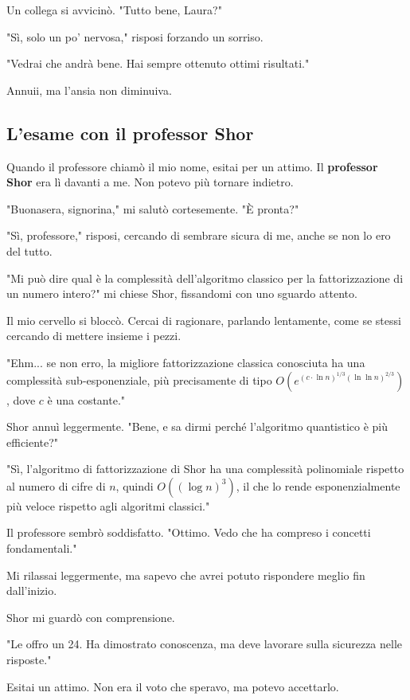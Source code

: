 Un collega si avvicinò. "Tutto bene, Laura?"

"Sì, solo un po' nervosa," risposi forzando un sorriso.

"Vedrai che andrà bene. Hai sempre ottenuto ottimi risultati."

Annuii, ma l'ansia non diminuiva.

\subsection{L'esame con il professor Shor}

Quando il professore chiamò il mio nome, esitai per un attimo. Il \textbf{professor Shor} era lì davanti a me. Non potevo più tornare indietro.

"Buonasera, signorina," mi salutò cortesemente. "È pronta?"

"Sì, professore," risposi, cercando di sembrare sicura di me, anche se non lo ero del tutto.

"Mi può dire qual è la complessità dell'algoritmo classico per la fattorizzazione di un numero intero?" mi chiese Shor, fissandomi con uno sguardo attento.

Il mio cervello si bloccò. Cercai di ragionare, parlando lentamente, come se stessi cercando di mettere insieme i pezzi.

"Ehm... se non erro, la migliore fattorizzazione classica conosciuta ha una complessità sub-esponenziale, più precisamente di tipo $O\left(e^{(c \cdot \ln n)^{1/3} (\ln \ln n)^{2/3}}\right)$, dove $c$ è una costante."

Shor annuì leggermente. "Bene, e sa dirmi perché l'algoritmo quantistico è più efficiente?"

"Sì, l'algoritmo di fattorizzazione di Shor ha una complessità polinomiale rispetto al numero di cifre di $n$, quindi $O((\log n)^3)$, il che lo rende esponenzialmente più veloce rispetto agli algoritmi classici."

Il professore sembrò soddisfatto. "Ottimo. Vedo che ha compreso i concetti fondamentali."

Mi rilassai leggermente, ma sapevo che avrei potuto rispondere meglio fin dall'inizio.

Shor mi guardò con comprensione.

"Le offro un 24. Ha dimostrato conoscenza, ma deve lavorare sulla sicurezza nelle risposte."

Esitai un attimo. Non era il voto che speravo, ma potevo accettarlo.


